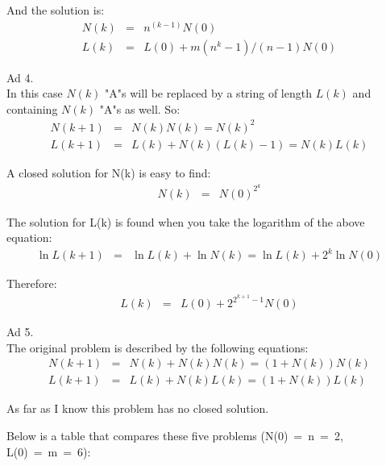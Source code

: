 \documentclass[onecolumn]{article}
\begin{document}
And the solution is:
\begin{eqnarray*}
          N(k) &=& n^(k-1) N(0)                         \\
          L(k) &=& L(0) + m (n^k -1)/(n-1) N(0)
\end{eqnarray*}

\noindent Ad 4. \\
In this case $N(k)$ "A"s will be replaced by a string of length $L(k)$ and containing $N(k)$ "A"s as well. So:
\begin{eqnarray*}
          N(k+1) &=& N(k) N(k) = N(k)^2                 \\
          L(k+1) &=& L(k) + N(k) (L(k)-1) = N(k) L(k)
\end{eqnarray*}

A closed solution for N(k) is easy to find:
\begin{eqnarray*}
          N(k) &=& N(0)^{2^k}
\end{eqnarray*}

The solution for L(k) is found when you take the logarithm of the above equation:
\begin{eqnarray*}
          \ln L(k+1) &=& \ln L(k) + \ln N(k) = \ln L(k) + 2^k \ln N(0)
\end{eqnarray*}

Therefore:
\begin{eqnarray*}
          L(k)  &=& L(0) + 2^{2^{k+1}-1} N(0)
\end{eqnarray*}

\noindent Ad 5. \\
The original problem is described by the following equations:
\begin{eqnarray*}
          N(k+1) &=& N(k) + N(k) N(k) = (1+N(k)) N(k) \\
          L(k+1) &=& L(k) + N(k) L(k) = (1+N(k)) L(k)
\end{eqnarray*}

As far as I know this problem has no closed solution.

Below is a table that compares these five problems (N(0)~=~n~=~2, L(0)~=~m~=~6):
\end{document}
